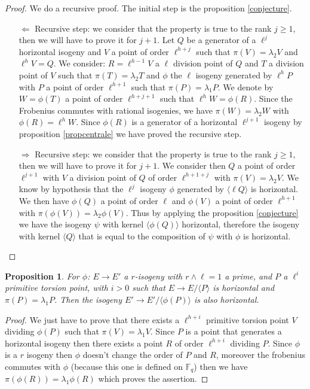 \documentclass{article}
\theoremstyle{plain}
\newtheorem{prop}[thm]{Proposition}
\theoremstyle{definition}
\theoremstyle{remark}
\begin{document}
\begin{proof}
We do a recursive proof. The initial step is the proposition \ref{conjecture}.
\begin{itemize}
\item[$\Leftarrow$]
Recursive step: we consider that the property is true to the rank $j \geqslant 1$, then we will have to prove it for $j+1$.
Let $Q$ be a generator of a $\ell^j$ horizontal isogeny and $V$ a point of order $\ell^{h+j}$ such that $\pi(V)=\lambda_2V$ and $\ell^{h}V=Q$. We consider: $R=\ell^{h-1}V$ a $\ell$ division point of $Q$ and $T$ a division point of $V$ such that $\pi(T)=\lambda_2T$ and $\phi$ the $\ell$ isogeny generated by $\ell^{h}P$ with $P$ a point of order $\ell^{h+1}$ such that $\pi(P)=\lambda_1P$.
We denote by $W=\phi(T)$ a point of order $\ell^{h+j+1}$ such that $\ell^hW=\phi(R)$. Since the Frobenius commutes with rational isogenies, we have $\pi(W)=\lambda_2W$ with $\phi(R)=\ell^{h}W$.  Since $\phi(R)$ is a generator of a horizontal $\ell^{j+1}$ isogeny by proposition \ref{propcentrale} we have proved the recursive step. 
\item[$\Rightarrow$]
Recursive step: we consider that the property is true to the rank $j \geqslant 1$, then we will have to prove it for $j+1$.
We consider then $Q$ a point of order $\ell^{j+1}$ with $V$ a division point of $Q$ of order $\ell^{h+1+j}$ with $\pi(V)=\lambda_2V$. We know by hypothesis that the $\ell^j$ isogeny $\phi$ generated by $\langle \ell Q \rangle$ is horizontal. We then have $\phi(Q)$ a point of order $\ell$ and $\phi(V)$ a point of order $\ell^{h+1}$ with $\pi(\phi(V))=\lambda_2\phi(V)$. Thus by applying the proposition \ref{conjecture} we have the isogeny $\psi$ with kernel $\langle \phi(Q) \rangle$ horizontal, therefore the isogeny with kernel $\langle Q \rangle$ that is equal to the composition of $\psi$ with $\phi$ is horizontal.
\end{itemize}
\end{proof}

\begin{prop}
For $\phi$: $E \rightarrow E'$ a $r$-isogeny  with $r \wedge \ell=1$ a prime, and $P$ a $\ell^i$ primitive torsion point, with $i>0$ such that $E \rightarrow E / \langle P \rangle $ is horizontal and $\pi(P)=\lambda_1P$. Then the isogeny  $E' \rightarrow E' / \langle \phi(P) \rangle$ is also horizontal.
\end{prop}

\begin{proof}
We just have to prove that there exists a $\ell^{h+i}$ primitive torsion point $V$ dividing $\phi(P)$ such that $\pi(V)=\lambda_1V$.
Since $P$ is a point that generates a horizontal isogeny then there exists a point $R$ of order $\ell^{h+i}$ dividing $P$. Since $\phi$ is a $r$ isogeny then $\phi$ doesn't change the order of $P$ and $R$, moreover the frobenius commutes with $\phi$ (because this one is defined on $\mathbb{F}_q$) then we have $\pi(\phi(R))=\lambda_1\phi(R)$ which proves the assertion.
\end{proof}
\end{document}
